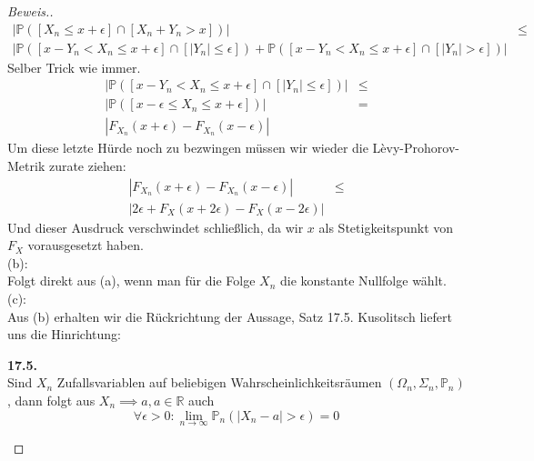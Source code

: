 \begin{proof}[Beweis.]
\begin{align*}
  | \mathbb{P}([X_n \leq x + \epsilon] \cap [X_n + Y_n > x])| &\leq \\
  | \mathbb{P}([x - Y_n < X_n \leq x + \epsilon] \cap [|Y_n| \leq \epsilon]) +  \mathbb{P}([x - Y_n < X_n \leq x + \epsilon] \cap [|Y_n| > \epsilon])|
\end{align*}
Selber Trick wie immer.
\begin{align*}
  | \mathbb{P}([x - Y_n < X_n \leq x + \epsilon] \cap [|Y_n| \leq \epsilon]) | &\leq \\
  | \mathbb{P}([x - \epsilon \leq X_n \leq x + \epsilon]) | &= \\
  | F_{X_n}(x + \epsilon) - F_{X_n}(x - \epsilon) |
\end{align*}
Um diese letzte Hürde noch zu bezwingen müssen wir wieder die Lèvy-Prohorov-Metrik zurate ziehen:
\begin{align*}
  | F_{X_n}(x + \epsilon) - F_{X_n}(x - \epsilon) | &\leq \\
  | 2\epsilon + F_X(x + 2\epsilon) - F_X(x -2\epsilon) |
\end{align*}
Und dieser Ausdruck verschwindet schließlich, da wir $x$ als Stetigkeitspunkt von $F_X$ vorausgesetzt haben. \\
(b): \\
Folgt direkt aus (a), wenn man für die Folge $X_n$ die konstante Nullfolge wählt. \\
(c): \\
Aus (b) erhalten wir die Rückrichtung der Aussage, Satz 17.5. Kusolitsch liefert uns die Hinrichtung:
\begin{satz}\textbf{17.5.}\\
Sind $X_n$ Zufallsvariablen auf beliebigen Wahrscheinlichkeitsräumen $(\Omega_n, \Sigma_n, \mathbb{P}_n)$, dann folgt aus
$X_n \implies a, a \in \mathbb{R} $ auch
\[\forall \epsilon > 0: \lim_{n \rightarrow \infty} \mathbb{P}_n(|X_n - a| > \epsilon) = 0 \]
\end{satz}
\end{proof}
